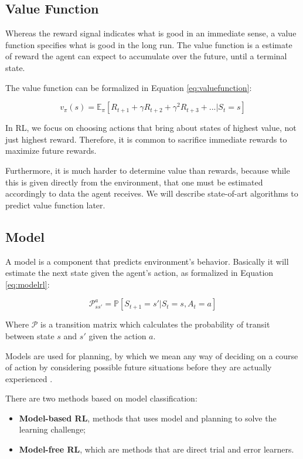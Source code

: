 \subsection{Value Function}
Whereas the reward signal indicates what is good in an immediate sense, a value function specifies what is good in the long run. The value function is a estimate of reward the agent can expect to accumulate over the future, until a terminal state. 

The value function can be formalized in Equation \ref{eq:valuefunction}:

\begin{equation}\label{eq:valuefunction}
v_{\pi}(s) = \mathbb{E}_{\pi}[R_{t+1} + \gamma R_{t+2} + \gamma^{2} R_{t + 3} + ... | S_{t} = s]
\end{equation}

In RL, we focus on choosing actions that bring about states of highest value, not just highest reward. Therefore, it is common to sacrifice immediate rewards to maximize future rewards.

Furthermore, it is much harder to determine value than rewards, because while this is given directly from the environment, that one must be estimated accordingly to data the agent receives. We will describe state-of-art algorithms to predict value function later.

\subsection{Model}

A model is a component that predicts environment's behavior. Basically it will estimate the next state given the agent's action, as formalized in Equation \ref{eq:modelrl}:

\begin{equation}\label{eq:modelrl}
\mathcal{P}_{ss'}^{a} = \mathbb{P}[S_{t+1} = s' | S_{t} = s, A_{t} = a]
\end{equation}

Where $\mathcal{P}$ is a transition matrix which calculates the probability of transit between state $s$ and $s'$ given the action $a$.

Models are used for planning, by which we
mean any way of deciding on a course of action by considering possible future situations before they are
actually experienced \cite{sutton1998rli}.

There are two methods based on model classification:

\begin{itemize}
	\item \textbf{Model-based RL}, methods that uses model and planning to solve the learning challenge;
	\item \textbf{Model-free RL}, which are methods that are direct trial and error learners.
\end{itemize}

